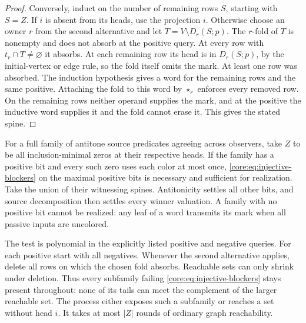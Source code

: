\begin{proof}
Conversely, induct on the number of remaining rows $S$, starting with
$S=Z$. If $i$ is absent from its heads, use the projection $i$.
Otherwise choose an owner $r$ from the second alternative and let
$T=V\setminus D_r(S;p)$. The $r$-fold of $T$ is nonempty and does
not absorb at the positive query. At every row with
$t_r\cap T\ne\varnothing$ it absorbs. At each remaining row its head
is in $D_r(S;p)$, by the initial-vertex or edge rule, so the fold
itself omits the mark. At least one row was absorbed. The induction
hypothesis gives a word for the remaining rows and the same positive.
Attaching the fold to this word by $\star_r$ enforces every removed
row. On the remaining rows neither operand supplies the mark, and at
the positive the inductive word supplies it and the fold cannot erase
it. This gives the stated spine.
\end{proof}

For a full family of antitone source predicates agreeing across observers,
take $Z$ to be all inclusion-minimal zeros at their respective heads.
If the family has a positive bit and every such zero uses each color
at most once, \eqref{core:eq:injective-blockers} on the maximal positive
bits is necessary and sufficient for realization. Take the union of
their witnessing spines. Antitonicity settles all other bits, and
source decomposition then settles every winner valuation. A family
with no positive bit cannot be realized: any leaf of a word transmits
its mark when all passive inputs are uncolored.

The test is polynomial in the explicitly listed positive and negative
queries. For each positive start with all negatives. Whenever the
second alternative applies, delete all rows on which the chosen fold absorbs.
Reachable sets can only shrink under deletion. Thus every subfamily
failing \eqref{core:eq:injective-blockers} stays present throughout:
none of its tails can meet the complement of the larger reachable set.
The process either exposes such a subfamily or reaches a set without
head $i$. It takes at most $|Z|$ rounds of ordinary graph reachability.

